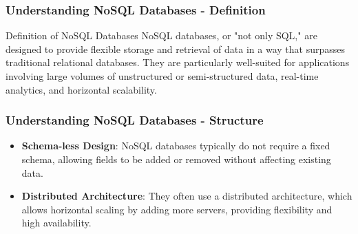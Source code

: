 \documentclass[aspectratio=169]{beamer}
\begin{document}
\begin{frame}[fragile]
    \frametitle{Understanding NoSQL Databases - Definition}
    \begin{block}{Definition of NoSQL Databases}
        NoSQL databases, or "not only SQL," are designed to provide flexible storage and retrieval of data in a way that surpasses traditional relational databases. 
        They are particularly well-suited for applications involving large volumes of unstructured or semi-structured data, real-time analytics, and horizontal scalability.
    \end{block}
\end{frame}

\begin{frame}[fragile]
    \frametitle{Understanding NoSQL Databases - Structure}
    \begin{itemize}
        \item \textbf{Schema-less Design}: NoSQL databases typically do not require a fixed schema, allowing fields to be added or removed without affecting existing data.
        
        \item \textbf{Distributed Architecture}: They often use a distributed architecture, which allows horizontal scaling by adding more servers, providing flexibility and high availability.
    \end{itemize}
\end{frame}
\end{document}
